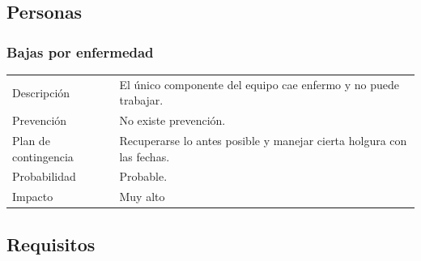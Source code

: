 \subsection{Personas}
\subsubsection{Bajas por enfermedad}
\begin{table}[H]
    \begin{center}
        \begin{tabular}{l p{8cm}}
            Descripci\'{o}n                 & El \'{u}nico componente del equipo cae enfermo y no puede trabajar. \\
            Prevenci\'{o}n                  & No existe prevenci\'{o}n. \\ 
            Plan de contingencia            & Recuperarse lo antes posible y manejar cierta holgura con las fechas.\\
            Probabilidad                    & Probable. \\
            Impacto                         & Muy alto \\
        \end{tabular}
    \end{center}
    
\end{table}

\subsection{Requisitos}
